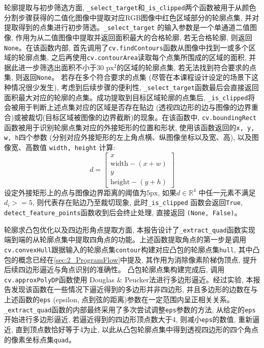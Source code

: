 轮廓提取与初步筛选方面, \texttt{\_select\_target}和\texttt{\_is\_clipped}两个函数被用于从颜色分割步骤获得的二值化图像中提取对应RGB图像中红色区域部分的轮廓点集, 并对提取得到的点集进行初步筛选。\texttt{\_select\_target} 的输入参数是一个单通道二值图像, 作用为从二值图像中提取并返回面积最大的合格轮廓, 若无合格轮廓, 则返回 \texttt{None}。在该函数内部, 首先调用了\texttt{cv.findContours}函数从图像中找到一或多个区域的轮廓点集, 之后再使用\texttt{cv.contourArea}读取每个点集所围成的区域的面积, 并据此进一步筛选出面积不小于30 $\mathrm{px}^2$的区域的轮廓点集, 若无法找到符合要求的点集, 则返回\texttt{None}。 若存在多个符合要求的点集 (尽管在本课程设计设定的场景下这种情况很少发生), 考虑到后续步骤的便利性, \texttt{\_select\_target}函数最后会直接返回面积最大对应的轮廓的点集。成功提取到目标区域轮廓的点集后, \texttt{\_is\_clipped}将会被用于判断上述点集对应的区域是否存在贴边 (透视四边形的边与图像的边界重合)或被裁切(目标区域被图像的边界截断)的现象。在该函数中, \texttt{cv.boundingRect}函数被用于识别轮廓点集对应的外接矩形的位置和形状, 使用该函数返回的\texttt{x, y, w, h}四个参数 (分别对应外接矩形的左上角点横、纵图像坐标以及宽、高), 以及图像宽、高数值 \texttt{width, height} 计算:
\begin{equation}
  d
  =
  \begin{bmatrix}
    x \\ \mathrm{width} - (x + w) \\ y \\ \mathrm{height} - (y + h)
  \end{bmatrix}
\end{equation}
设定外接矩形上的点与图像边界距离的阈值为$5 \mathrm{px}$, 如果$d \in \mathbb{R}^4$ 中任一元素不满足$d_i >= 5$, 则代表存在贴边乃至裁切现象, 此时\texttt{\_is\_clipped} 函数会返回\texttt{True}, \texttt{detect\_feature\_points}函数收到后会终止处理, 直接返回 \texttt{(None, False)}。

轮廓求凸包优化以及四边形角点提取方面, 本报告设计了\texttt{\_extract\_quad}函数实现端到端的从轮廓点集中提取四角点的功能。上述函数提取角点的第一步是调用\texttt{cv.convexHull}跟据输入的轮廓点集\texttt{contour}构建对应凸包的轮廓点集\texttt{hull}, 其中凸包的概念已经在\ref{sec:2_ProgramFlow}中提及, 其作用为消除像素阶梯伪顶点, 提升后续四边形逼近与角点识别的准确性。
凸包轮廓点集构建完成后, 调用\texttt{cv.approxPolyDP}函数使用 Douglas \& Peucker法进行多边形逼近。经过实验, 本报告发现该函数在一些情况下逼近得到的多边形并非四边形, 并且多边形的边数在与上述函数的\texttt{eps} (epsilon, 点到弦的距离)参数在一定范围内呈正相关关系。\texttt{\_extract\_quad}函数的内部最终采用了多次尝试调整\texttt{eps}参数的方法, 从给定的\texttt{eps}开始进行多边形逼近, 若逼近得到的四边形顶点数大于4, 则减小\texttt{eps}的数值, 重新逼近, 直到顶点数恰好等于4为止, 以此从凸包轮廓点集中得到透视四边形的四个角点的像素坐标点集\texttt{quad}。

